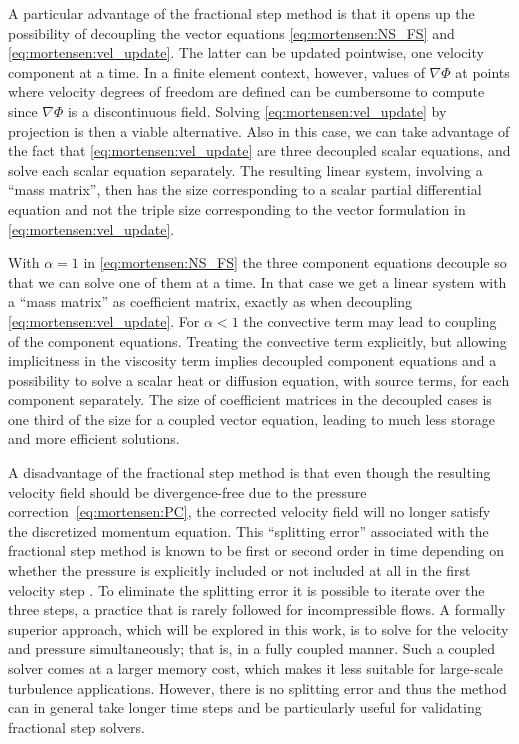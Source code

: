 A particular advantage of the fractional step method is that
it opens up the possibility of decoupling the vector equations
\eqref{eq:mortensen:NS_FS} and \eqref{eq:mortensen:vel_update}. The
latter can be updated pointwise, one velocity component at a time. In
a finite element context, however, values of $\nabla\Phi$ at points
where velocity degrees of freedom are defined can be cumbersome
to compute since $\nabla\Phi$ is a discontinuous field. Solving
\eqref{eq:mortensen:vel_update} by projection is then a viable
alternative. Also in this case, we can take advantage of the fact that
\eqref{eq:mortensen:vel_update} are three decoupled scalar equations,
and solve each scalar equation separately. The resulting linear system,
involving a ``mass matrix'', then has the size corresponding to a
scalar partial differential equation and not the triple size
corresponding to the vector formulation in \eqref{eq:mortensen:vel_update}.

With $\alpha =1$ in \eqref{eq:mortensen:NS_FS} the three component
equations decouple so that we can solve one of them at a time. In that
case we get a linear system with a ``mass matrix'' as coefficient
matrix, exactly as when decoupling \eqref{eq:mortensen:vel_update}.
For $\alpha <1$ the convective term may lead to coupling of the component
equations. Treating the convective term explicitly, but allowing
implicitness in the viscosity term implies decoupled component equations
and a possibility to solve a scalar heat or diffusion equation, with
source terms, for each component separately.  The size of coefficient
matrices in the decoupled cases is one third of the size for a coupled
vector equation, leading to much less storage and more efficient
solutions.

A disadvantage of the fractional step method is that even though the
resulting velocity field should be divergence-free due to the pressure
correction~\eqref{eq:mortensen:PC}, the corrected velocity field will
no longer satisfy the discretized momentum equation. This ``splitting
error'' associated with the fractional step method is known to be
first or second order in time depending on whether the pressure is
explicitly included or not included at all in the first velocity step
\citep{GuermondMinevShen2006}. To eliminate the splitting error it is
possible to iterate over the three steps, a practice that is rarely
followed for incompressible flows. A formally superior approach, which
will be explored in this work, is to solve for the velocity and pressure
simultaneously; that is, in a fully coupled manner.  Such a coupled
solver comes at a larger memory cost, which makes it less suitable for
large-scale turbulence applications. However, there is no splitting
error and thus the method can in general take longer time steps and be
particularly useful for validating fractional step solvers.

